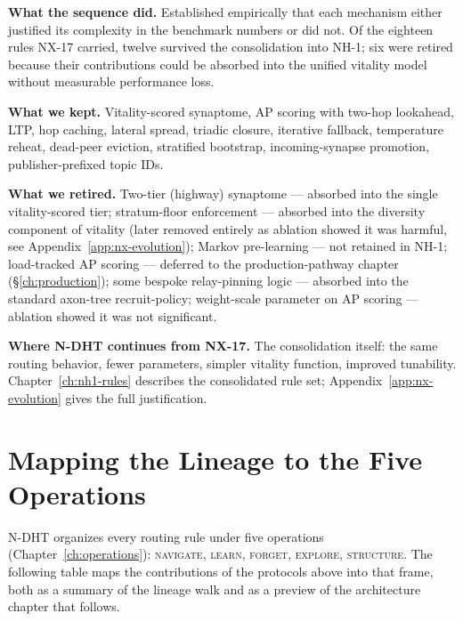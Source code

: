 \documentclass[twoside,nobib]{tufte-book}
\newcommand{\NDHT}{N-DHT\xspace}
\begin{document}
\textbf{What the sequence did.} Established empirically that each
mechanism either justified its complexity in the benchmark numbers
or did not. Of the eighteen rules NX-17 carried, twelve survived
the consolidation into NH-1; six were retired because their
contributions could be absorbed into the unified vitality model
without measurable performance loss.

\textbf{What we kept.} Vitality-scored synaptome, AP scoring with
two-hop lookahead, LTP, hop caching, lateral spread, triadic
closure, iterative fallback, temperature reheat, dead-peer
eviction, stratified bootstrap, incoming-synapse promotion,
publisher-prefixed topic IDs.

\textbf{What we retired.} Two-tier (highway) synaptome --- absorbed
into the single vitality-scored tier; stratum-floor enforcement ---
absorbed into the diversity component of vitality (later removed
entirely as ablation showed it was harmful, see
Appendix~\ref{app:nx-evolution}); Markov pre-learning --- not
retained in NH-1; load-tracked AP scoring --- deferred to the
production-pathway chapter (\S\ref{ch:production}); some bespoke
relay-pinning logic --- absorbed into the standard axon-tree
recruit-policy; weight-scale parameter on AP scoring --- ablation
showed it was not significant.

\textbf{Where \NDHT continues from NX-17.} The consolidation
itself: the same routing behavior, fewer parameters, simpler
vitality function, improved tunability. Chapter~\ref{ch:nh1-rules}
describes the consolidated rule set; Appendix~\ref{app:nx-evolution}
gives the full justification.

\section{Mapping the Lineage to the Five Operations}

\NDHT organizes every routing rule under five operations
(Chapter~\ref{ch:operations}): \textsc{navigate}, \textsc{learn},
\textsc{forget}, \textsc{explore}, \textsc{structure}. The
following table maps the contributions of the protocols above
into that frame, both as a summary of the lineage walk and as a
preview of the architecture chapter that follows.
\end{document}
